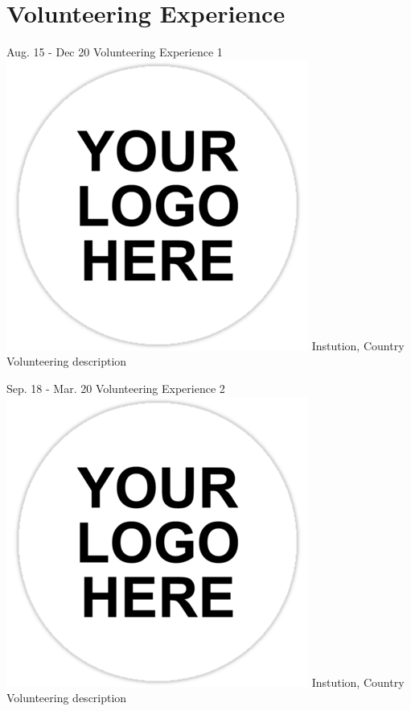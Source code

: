 \documentclass[american]{cv-class}
\begin{document}
\newpage

\section{Volunteering Experience}
\begin{entrylist}
	  
	\entry
	{Aug. 15 - Dec 20}
	{Volunteering Experience 1}
	{{\includegraphics[scale=0.05]{img/generic-logo.png}} Instution, Country} 
	{\justifying Volunteering description}
	  
	\entry
	{Sep. 18 - Mar. 20}
	{Volunteering Experience 2}
	{{\includegraphics[scale=0.05]{img/generic-logo.png}} Instution, Country} 
	{\justifying Volunteering description}
	

\end{entrylist}
\end{document}
